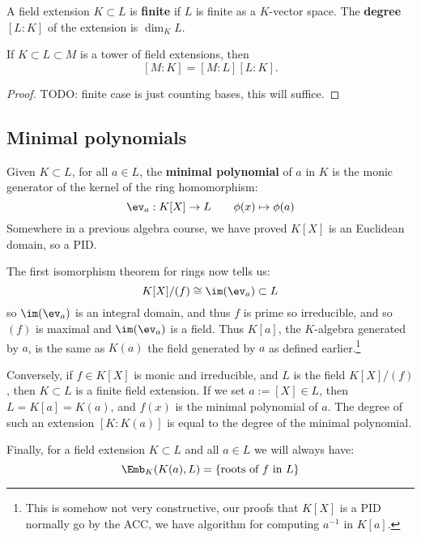 \documentclass{article}
\begin{document}
\begin{definition}
    A field extension $K\subset L$ is \textbf{finite} if $L$ is finite as a $K$-vector space. The \textbf{degree} $[L:K]$ of the extension is $\dim_KL$.
\end{definition}

\begin{proposition}
    If $K\subset L \subset M$ is a tower of field extensions, then \[[M:K]=[M:L][L:K].\]\begin{proof}
        TODO: finite case is just counting bases, this will suffice.
    \end{proof}
\end{proposition}

\subsection{Minimal polynomials}

\begin{definition}
    Given $K\subset L$, for all $a\in L$, the \textbf{minimal polynomial} of $a$ in $K$ is the monic generator of the kernel of the ring homomorphism: \[
        \ev_a : K[X] \rightarrow L \qquad \phi(x) \mapsto \phi(a)
    \] Somewhere in a previous algebra course, we have proved $K[X]$ is an Euclidean domain, so a PID.
\end{definition}

The first isomorphism theorem for rings now tells us: \[
    K[X] / (f) \cong \im(\ev_a) \subset L
\] so $\im(\ev_a)$ is an integral domain, and thus $f$ is prime so irreducible, and so $(f)$ is maximal and $\im(\ev_a)$ is a field. Thus $K[a]$, the $K$-algebra generated by $a$, is the same as $K(a)$ the field generated by $a$ as defined earlier.\footnote{
    This is somehow not very constructive, our proofs that $K[X]$ is a PID normally go by the ACC, we have algorithm for computing $a^{-1}$ in $K[a]$.
}

Conversely, if $f\in K[X]$ is monic and irreducible, and $L$ is the field $K[X]/(f)$, then $K\subset L$ is a finite field extension. If we set $a:=[X] \in L$, then $L=K[a]=K(a)$, and $f(x)$ is the minimal polynomial of $a$. The degree of such an extension $[K:K(a)]$ is equal to the degree of the minimal polynomial.

Finally, for a field extension $K\subset L$ and all $a \in L$ we will always have: \[
    \Emb_K(K(a),L) = \{\text{roots of $f$ in $L$}\}
\]
\end{document}
